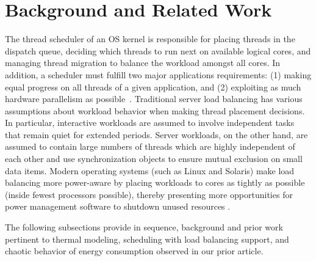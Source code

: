 \documentclass[times, 10pt,twocolumn]{IEEEtran}
\begin{document}
\section{Background and Related Work}
\label{sec:related}
The thread scheduler of an OS kernel is responsible for placing threads in the
dispatch queue, deciding which threads to run next on available logical cores,
and managing thread migration to balance the workload amongst all cores.
In addition, a scheduler must fulfill two major applications requirements:
(1) making equal progress on all threads of a given application, 
and (2) exploiting as much hardware parallelism as
possible~\cite{Hofmeyr2010}. Traditional server load balancing
has various assumptions about workload behavior when making thread placement decisions.  
In particular, interactive workloads are assumed to involve independent tasks that remain quiet for extended periods.  
Server workloads, on the other hand, are assumed to contain large numbers of threads
which are highly independent of each other and use synchronization objects to
ensure mutual exclusion on small data items. 
Modern operating systems (such as Linux and Solaris)
make load balancing more power-aware by placing 
workloads to cores as tightly as possible (inside fewest processors possible),
thereby presenting more opportunities for power management software to shutdown
unused resources \cite{Sun2009,Sun2009b,Xia2010}.

The following subsections provide in sequence,
background and prior work pertinent to thermal modeling,
scheduling with load balancing support, and chaotic behavior of energy consumption
observed in our prior article.
\end{document}
